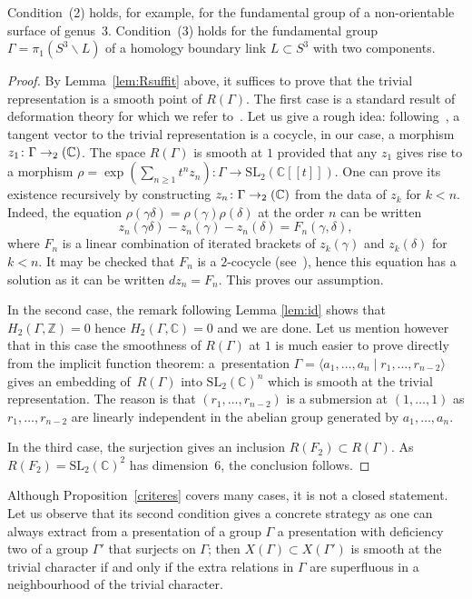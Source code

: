 \documentclass[11pt]{article}
\newcommand{\lbr}{[\![}
\newcommand{\rbr}{]\!]}
\newcommand{\NoChangel}[1]{%
\expandafter\let\csname old\string#1\endcsname=#1
\let#1=\relax
\newcommand{#1}{\mathcode`l="716C\csname old\string#1\endcsname\mathcode`l="7160 }%
}
\theoremstyle{definition}
\newcommand{\ZZ}{\mathbb{Z}}
\newcommand{\CC}{\mathbb{C}}
\newcommand{\SL}{\mathrm{SL}}
\newcommand{\petitsl}{\mathrm{sl}}\NoChangel{\petitsl}
\begin{document}
Condition~(2) holds, for example, for the fundamental group of a
non-orientable surface of genus~3.
Condition~(3) holds for the fundamental group
$\Gamma=\pi_1(S^3\smallsetminus L)$ of a homology boundary link
$L\subset S^3$ with two components.

\begin{proof}
By Lemma~\ref{lem:Rsuffit} above, it suffices to prove that the trivial
representation is a smooth point of $R(\Gamma)$. The first case is a
standard result of deformation theory for which we refer
to~\cite{NijenhuisRichardson}. Let us give a rough idea:
following~\cite{Weil}, a tangent vector to the trivial representation is
a cocycle, in our case, a morphism $z_1\colon\Gamma\to \petitsl_2(\CC)$.
The space $R(\Gamma)$ is smooth at $1$ provided that any $z_1$ gives rise
to a morphism
$\rho=\exp(\sum_{n\geq 1} t^n z_n)\colon\Gamma\to \SL_2(\CC\lbr t\rbr)$.
One can prove its existence recursively by constructing
$z_n\colon\Gamma\to\petitsl_2(\CC)$ from the data of $z_k$ for $k<n$.
Indeed, the equation $\rho(\gamma\delta)=\rho(\gamma)\rho(\delta)$ at
the order $n$ can be written
\[ z_n(\gamma\delta)-z_n(\gamma)-z_n(\delta)=F_n(\gamma,\delta), \]
where $F_n$ is a linear combination of iterated brackets of $z_k(\gamma)$
and $z_k(\delta)$ for $k<n$. It may be checked that $F_n$ is a $2$-cocycle
(see~\cite{NijenhuisRichardson}), hence this equation has a solution as it
can be written $dz_n=F_n$. This proves our assumption.

In the second case, the remark following Lemma \ref{lem:id}
shows that $H_2(\Gamma,\ZZ)=0$ hence
$H_2(\Gamma,\CC)=0$ and we are done. Let us mention however that in this case
the smoothness of $R(\Gamma)$ at $1$ is much easier to prove directly from
the implicit function theorem: a~presentation
$\Gamma=\langle a_1,\ldots,a_n\mid r_1,\ldots,r_{n-2}\rangle$
gives an embedding of~$R(\Gamma)$ into $\SL_2(\CC)^n$ which
is smooth at the trivial representation. The reason is that
$(r_1,\ldots,r_{n-2})$ is a submersion at
$(1,\ldots,1)$ as $r_1,\ldots,r_{n-2}$ are linearly independent
in the abelian group generated by $a_1,\ldots,a_n$.

In the third case, the surjection gives an inclusion
$R(F_2)\subset R(\Gamma)$. As $R(F_2)=\SL_2(\CC)^2$ has dimension~6, the
conclusion follows.
\end{proof}

Although Proposition~\ref{criteres} covers many cases, it is not a closed
statement. Let us observe that its second condition gives a concrete
strategy as one can always extract from a presentation of a group $\Gamma$
a presentation with deficiency two of a group $\Gamma'$ that surjects on
$\Gamma$; then $X(\Gamma)\subset X(\Gamma')$ is smooth at the trivial
character if and only if the extra relations in $\Gamma$ are superfluous in
a neighbourhood of the trivial character.
\end{document}
